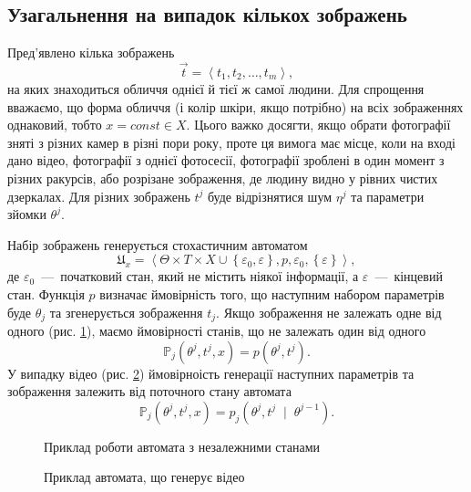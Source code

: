 \subsection{Узагальнення на випадок кількох зображень}

Пред'явлено кілька зображень
\begin{equation*}
  \vec{t} = \left\langle t_1, t_2, \dots, t_m \right\rangle,
\end{equation*}
на яких знаходиться обличчя однієї й тієї ж самої людини.
Для спрощення вважаємо,
що форма обличчя (і колір шкіри, якщо потрібно)
на всіх зображеннях однаковий, тобто $x = const \in X$.
Цього важко досягти,
якщо обрати фотографії зняті з різних камер в різні пори року,
проте ця вимога має місце,
коли на вході дано відео, фотографії з однієї фотосесії,
фотографії зроблені в один момент з різних ракурсів,
або розрізане зображення, де людину видно у рівних чистих дзеркалах.
Для різних зображень $t^j$ буде відрізнятися
шум $\eta^j$ та параметри зйомки $\theta^j$.

Набір зображень генерується стохастичним автоматом \cite{Rabin:1963}
\begin{equation*}
  \mathfrak{U}_x = \left\langle
    \Theta \times T \times X
      \cup \left\{ \varepsilon_0, \varepsilon \right\}, p, \varepsilon_0,
    \left\{ \varepsilon \right\}
  \right\rangle,
\end{equation*}
де $\varepsilon_0$~---~початковий стан, який не містить ніякої інформації,
а $\varepsilon$~---~кінцевий стан.
Функція $p$ визначає ймовірність того,
що наступним набором параметрів буде $\theta_j$
та згенерується зображення $t_j$.
Якщо зображення не залежать одне від одного
(рис. \ref{fig:solutions:tree-images}),
маємо ймовірності станів,
що не залежать один від одного
\begin{equation*}
  \mathbb{P}_j\left( \theta^j, t^j, x \right)
  = p\left( \theta^j, t^j \right).
\end{equation*}
У випадку відео (рис. \ref{fig:solutions:tree-video})
ймовірноість генерації наступних параметрів та зображення
залежить від поточного стану автомата
\begin{equation*}
  \mathbb{P}_j\left( \theta^j, t^j, x \right)
  = p_j\left( \theta^j, t^j \; \mid \; \theta^{j-1} \right).
\end{equation*}

\begin{figure}[h]
  \centering
  
  \caption{Приклад роботи автомата з незалежними станами}
  \label{fig:solutions:tree-images}
\end{figure}

\begin{figure}[h]
  \centering
  
  \caption{Приклад автомата, що генерує відео}
  \label{fig:solutions:tree-video}
\end{figure}
